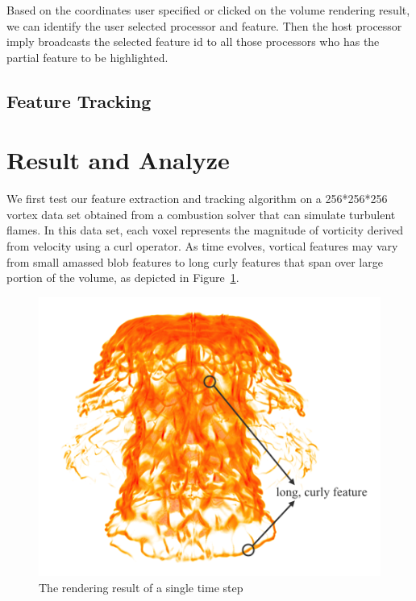 \documentclass[10pt, conference, compsocconf]{IEEEtran}
\begin{document}
Based on the coordinates user specified or clicked on the volume rendering result, 
we can identify the user selected processor and feature.
Then the host processor imply broadcasts the selected feature id to all those processors who has the partial feature to be highlighted.

\subsection{Feature Tracking}


\section{Result and Analyze}
We first test our feature extraction and tracking algorithm on a 256*256*256 vortex data set obtained from a combustion solver that can simulate turbulent flames. In this data set, each voxel represents the magnitude of vorticity derived from velocity using a curl operator. As time evolves, vortical features may vary from small amassed blob features to long curly features that span over large portion of the volume, as depicted in Figure~\ref{fig:combustion-labeled}.

\begin{figure}[!htp]
\includegraphics[width=0.9\linewidth]{combustion_labeled.png}
\caption{The rendering result of a single time step }
\label{fig:combustion-labeled}
\end{figure}
\end{document}
